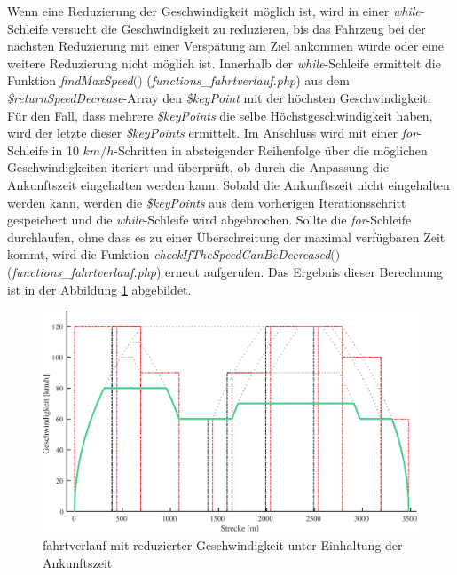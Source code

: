 Wenn eine Reduzierung der Geschwindigkeit möglich ist, wird in einer \textit{while}-Schleife versucht die Geschwindigkeit zu reduzieren, bis das Fahrzeug bei der nächsten Reduzierung mit einer Verspätung am Ziel ankommen würde oder eine weitere Reduzierung nicht möglich ist. Innerhalb der \textit{while}-Schleife ermittelt die Funktion \textit{find\-Max\-Speed$($$)$} (\textit{functions\_fahrtverlauf.php}) aus dem \textit{\$returnSpeedDecrease}-Array den \textit{\$keyPoint} mit der höchsten Geschwindigkeit. Für den Fall, dass mehrere \textit{\$keyPoints} die selbe Höchstgeschwindigkeit haben, wird der letzte dieser \textit{\$keyPoints} ermittelt. Im Anschluss wird mit einer \textit{for}-Schleife in 10 $km/h$-Schritten in absteigender Reihenfolge über die möglichen Geschwindigkeiten iteriert und überprüft, ob durch die Anpassung die Ankunftszeit eingehalten werden kann. Sobald die Ankunftszeit nicht eingehalten werden kann, werden die \textit{\$keyPoints} aus dem vorherigen Iterationsschritt gespeichert und die \textit{while}-Schleife wird abgebrochen. Sollte die \textit{for}-Schleife durchlaufen, ohne dass es zu einer Überschreitung der maximal verfügbaren Zeit kommt, wird die Funktion \textit{checkIfTheSpeedCanBeDecreased$($$)$} (\textit{functions\_fahrtverlauf.php}) erneut aufgerufen. 
Das Ergebnis dieser Berechnung ist in der Abbildung \ref{fig:it10} abgebildet.
\begin{figure}
\includegraphics[width=\linewidth]{../images/matlab/it10.pdf}
\caption{\Gls{fahrtverlauf} mit reduzierter Geschwindigkeit unter Einhaltung der An\-kunfts\-zeit}
\label{fig:it10}
\end{figure}
